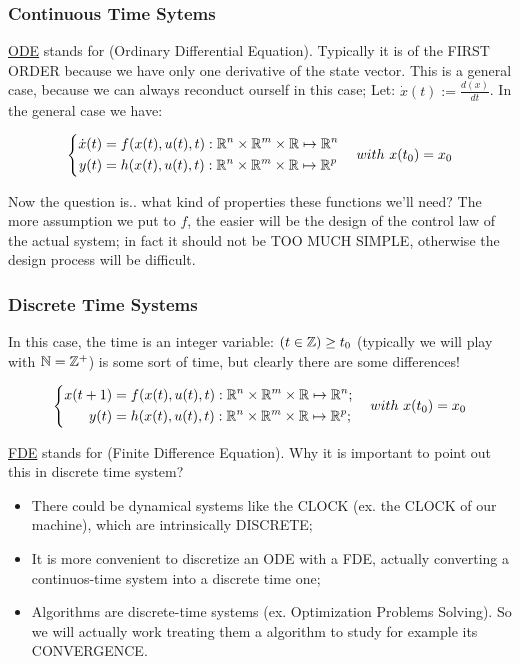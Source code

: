 \subsubsection{Continuous Time Sytems}

\underline{ODE} stands for (Ordinary Differential Equation). Typically it is of the FIRST ORDER because we have only one derivative of the state vector. This is a general case, because we can always reconduct ourself in this case; Let: $\dot{x}(t) := \frac{d(x)}{dt}$. In the general case we have:

\begin{equation}
\left\{
\begin{aligned}
\dot{x}(t) &= f(x(t), u(t), t) : \mathbb{R}^n\times\mathbb{R}^m\times\mathbb{R} \mapsto \mathbb{R}^n\\
y(t) &= h(x(t), u(t), t) : \mathbb{R}^n\times\mathbb{R}^m\times\mathbb{R} \mapsto \mathbb{R}^p
\end{aligned} 
\right.
\\
\quad with\ x(t_0) = x_0
\end{equation}

Now the question is.. what kind of properties these functions we'll need? 
The more assumption we put to $f$, the easier will be the design of the control law of the actual system; in fact it should not be TOO MUCH SIMPLE, otherwise the design process will be difficult.

\subsubsection{Discrete Time Systems}

In this case, the time is an integer variable: $(t \in \mathbb{Z}) \geq t_0$ (typically we will play with $\mathbb{N} = \mathbb{Z}^+$) is some sort of time, but clearly there are some differences! 

\begin{equation}
\left\{
\begin{aligned}
x(t+1) &= f(x(t), u(t), t) : \mathbb{R}^n\times\mathbb{R}^m\times\mathbb{R} \mapsto \mathbb{R}^n; \\
y(t) &= h(x(t), u(t), t) : \mathbb{R}^n\times\mathbb{R}^m\times\mathbb{R} \mapsto \mathbb{R}^p;
\end{aligned} 
\right.
\\
\quad with\ x(t_0) = x_0
\end{equation}


\underline{FDE} stands for (Finite Difference Equation). Why it is important to point out this in discrete time system? 

\begin{itemize}
\item There could be dynamical systems like the CLOCK (ex. the CLOCK of our machine), which are intrinsically DISCRETE;
\item It is more convenient to discretize an ODE with a FDE, actually converting a continuos-time system into a discrete time one;
\item Algorithms are discrete-time systems (ex. Optimization Problems Solving). So we will actually work treating them a algorithm to study for example its CONVERGENCE.
\end{itemize}

